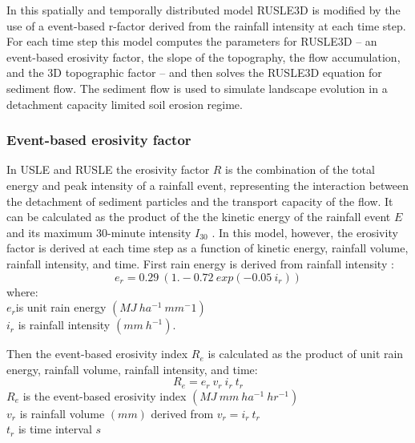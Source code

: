 \documentclass[esurf, manuscript]{copernicus}
\begin{document}
In this spatially and temporally distributed model 
RUSLE3D is modified by the use of a 
event-based r-factor derived from the rainfall intensity 
at each time step.
For each time step
this model computes the parameters for RUSLE3D -- 
an event-based erosivity factor,
the slope of the topography, the flow accumulation, and
the 3D topographic factor -- and then
solves the RUSLE3D equation for sediment flow. 
The sediment flow is used to simulate landscape evolution 
in a detachment capacity limited soil erosion regime.



\subsubsection{Event-based erosivity factor}

In USLE and RUSLE the erosivity factor $R$ 
is the combination of the total energy and peak intensity of a rainfall event,
representing the interaction between the detachment of sediment particles
and the transport capacity of the flow. 
It can be calculated as the product of the 
the kinetic energy of the rainfall event $E$
and its maximum 30-minute intensity $I_{30}$
\citep{Brown1987,Renard1997}.
%
In this model, however, the erosivity factor
is derived at each time step as a function of
kinetic energy, rainfall volume, rainfall intensity, and time.
%
First rain energy is derived from rainfall intensity \citep{Brown1987}:
%
\begin{equation}
\label{eq:rain_energy}
{e_r = 0.29 ~ (1.-0.72 ~ exp(-0.05 ~ i_r))}
\end{equation}
%
{\small
\noindent
where: \\
\noindent
\hspace*{0.5em} $e_r$is unit rain energy $(MJ ~ ha^{-1} ~ mm{^-1})$\\
\hspace*{0.5em} $i_r$ is rainfall intensity $(mm ~ h^{-1})$.\\
}

\noindent
Then the event-based erosivity index $R_e$ 
is calculated as the product of 
unit rain energy, rainfall volume, rainfall intensity, and time: 
\begin{equation}
\label{eq:erosivity_index}
{R_e = e_r ~ v_r ~ i_r ~ t_r}
\end{equation}
%
{\small
\noindent
\hspace*{0.5em} $R_e$ is the event-based erosivity index $(MJ ~ mm ~ ha^{-1} ~ hr^{-1})$\\
\hspace*{0.5em} $v_r$ is rainfall volume $(mm)$ derived from ${v_r = i_r ~ t_r}$\\
\hspace*{0.5em} $t_r$ is time interval $s$\\ 
}
\end{document}

